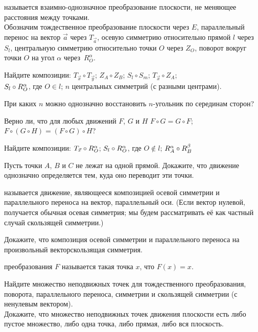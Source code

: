 \documentclass[a4paper,12pt]{article}
\begin{document}


 называется взаимно-однозначное преобразование плоскости, не меняющее расстояния между точками.\\
 Обозначим тождественное преобразование плоскости через $E$, параллельный перенос на вектор $\vec{a}$ через $T_{\vec{a}}$, осевую симметрию относительно прямой $l$ через $S_l$, центральную симметрию относительно точки $O$ через $Z_O$, поворот вокруг точки $O$ на угол $\alpha$ через~$R_O^\alpha$.

Найдите композиции:
 $T_{\vec{x}}\circ T_{\vec{y}}$;
 $Z_A\circ Z_B$;
 $S_l\circ S_m$;
 $T_{\vec{x}}\circ Z_A$; \\
 $S_l\circ R_O^\alpha$, где $O\in l$;
 $n$ центральных симметрий (с разными центрами).

При каких $n$ можно однозначно восстановить $n$-угольник по серединам сторон?

Верно ли, что для любых движений $F$, $G$ и $H$
 $F\circ G = G\circ F$;
 $F\circ (G\circ H) = (F\circ G)\circ H$?

Найдите композиции:
 $T_{\vec{x}}\circ R_O^\alpha$;
 $S_l\circ R_O^\alpha$, где $O\not\in l$;
 $R_A^\alpha\circ R_B^\beta$

Пусть точки $A$, $B$ и $C$ не лежат на одной прямой.
Докажите, что движение однозначно определяется тем,
куда оно переводит эти точки.

 называется движение, являющееся композицией осевой симметрии и параллельного переноса на вектор, параллельный оси. (Если вектор нулевой, получается обычная осевая симметрия; мы будем рассматривать её как частный случай скользящей симметрии.)

Докажите, что композиция осевой симметрии и параллельного переноса на произвольный вектор\т скользящая симметрия.

 преобразования $F$ называется такая точка $x$, что $F(x)=x$.

Найдите множество неподвижных точек для тождественного преобразования, поворота, параллельного переноса, симметрии и скользящей симметрии (с ненулевым вектором). \\
Докажите, что множество неподвижных точек движения плоскости есть либо пустое множество, либо одна точка, либо прямая, либо вся плоскость.
\end{document}

